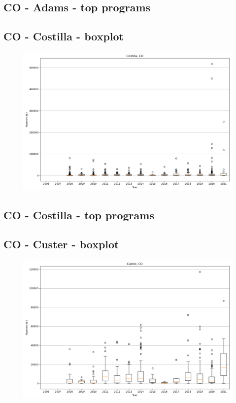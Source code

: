 \subsection*{CO - Adams - top programs}

\newpage
\subsection*{CO - Costilla - boxplot}
\begin{figure}[h]
\centering
\includegraphics[width=7in]{../output/boxplots/counties/Costilla-CO_boxplot.png}
\end{figure}


\subsection*{CO - Costilla - top programs}

\newpage
\subsection*{CO - Custer - boxplot}
\begin{figure}[h]
\centering
\includegraphics[width=7in]{../output/boxplots/counties/Custer-CO_boxplot.png}
\end{figure}



